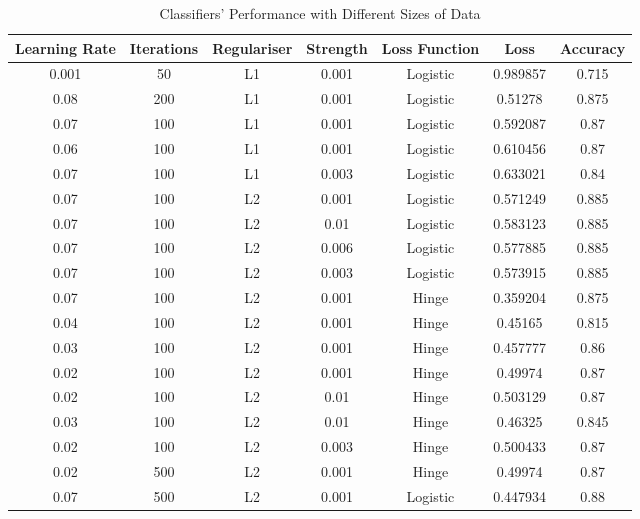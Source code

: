 \documentclass[11pt]{article} %
\begin{document}
\begin{table}[h]
    \begin{center}
        \label{tab:table1}
        \begin{tabular}{c|c|c|c|c|c|c}
            \textbf{Learning Rate} & \textbf{Iterations} & \textbf{Regulariser} & \textbf{Strength} & \textbf{Loss Function} & \textbf{Loss} & \textbf{Accuracy}\\
            \hline
            0.001 & 50 & L1 & 0.001 & Logistic & 0.989857 & 0.715\\
            0.08 & 200 & L1 & 0.001 & Logistic & 0.51278 & 0.875\\
            0.07 & 100 & L1 & 0.001 & Logistic & 0.592087 & 0.87\\
            0.06 & 100 & L1 & 0.001 & Logistic & 0.610456 & 0.87\\
            0.07 & 100 & L1 & 0.003 & Logistic & 0.633021 & 0.84\\
            0.07 & 100 & L2 & 0.001 & Logistic & 0.571249 & 0.885\\
            0.07 & 100 & L2 & 0.01 & Logistic & 0.583123 & 0.885\\
            0.07 & 100 & L2 & 0.006 & Logistic & 0.577885 & 0.885\\
            0.07 & 100 & L2 & 0.003 & Logistic & 0.573915 & 0.885\\
            0.07 & 100 & L2 & 0.001 & Hinge & 0.359204 & 0.875\\
            0.04 & 100 & L2 & 0.001 & Hinge & 0.45165 & 0.815\\
            0.03 & 100 & L2 & 0.001 & Hinge & 0.457777 & 0.86\\
            0.02 & 100 & L2 & 0.001 & Hinge & 0.49974 & 0.87\\
            0.02 & 100 & L2 & 0.01 & Hinge & 0.503129 & 0.87\\
            0.03 & 100 & L2 & 0.01 & Hinge & 0.46325 & 0.845\\
            0.02 & 100 & L2 & 0.003 & Hinge & 0.500433 & 0.87\\
            0.02 & 500 & L2 & 0.001 & Hinge & 0.49974 & 0.87\\
            0.07 & 500 & L2 & 0.001 & Logistic & 0.447934 & 0.88\\
        \end{tabular}
        \caption{Classifiers' Performance with Different Sizes of Data}
    \end{center}
\end{table}
\end{document}
